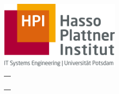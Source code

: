 \newenvironment{myepigraph}
  {\par\hfill
   \begin{tabular}{@{}r@{\hspace{13em}}}}
  {\end{tabular}\par\medskip}

\begin{titlepage}
	\begin{addmargin}[-1cm]{-3cm}
    \begin{center}
        \hfill

        \vfill

        \begingroup
          \color{Maroon}\spacedallcaps{\myTitle} \\
          \color{Maroon}\spacedallcaps{\mySubtitle}\\[1em]
          \color{Black}\spacedlowsmallcaps{\myTitleGer}
          \\[3em]
        \endgroup

        {\color{Black}\spacedlowsmallcaps{\myName}\\
        \spacedlowsmallcaps{\myTime}}

        \hfill



        \vfill

        \includegraphics[width=6cm]{gfx/logo.jpg} \\[2ex]
        \begin{myepigraph}
        \spacedlowsmallcaps{Supervised by}\\
        \myProf\\
        \mySupervisorA\\
        \mySupervisorB\\
        \spacedlowsmallcaps{\myFaculty}
        \end{myepigraph}

        \vfill

    \end{center}
  \end{addmargin}
\end{titlepage}